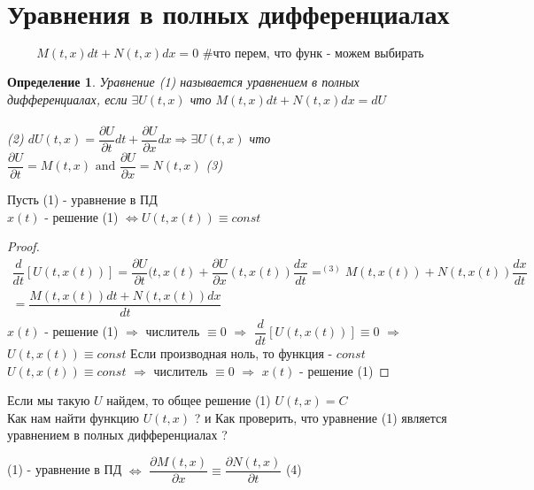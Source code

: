 \documentclass[12pt,a4paper,hidelinks]{article}            %
\newcommand{\pd}[2]{\dfrac{\partial #1}{\partial #2}}
\newcommand{\dd}[2]{\dfrac{d #1}{d #2}}
\newtheorem*{mdef}{Определение}
\begin{document}
\section{Уравнения в полных дифференциалах}
\begin{equation}\tag{1}
  M(t,x)dt+N(t,x)dx=0  
  \mbox{ \# что перем, что функ - можем выбирать}
\end{equation}
\begin{mdef}
	Уравнение (1) называется уравнением в полных дифференциалах, если $\exists U(t,x)$ что $M(t,x)dt+N(t,x)dx=dU$ \\\\
	(2) $dU(t,x)=\pd{U}{t}dt+\pd{U}{x}dx\Rightarrow\exists U(t,x)$ что $\pd{U}{t}=M(t,x) \mbox{ and } \pd{U}{x}=N(t,x)$ (3)
\end{mdef}

\begin{thm-hand}[1]
	Пусть (1) - уравнение в ПД \\
	$x(t)$ - решение (1) $\Longleftrightarrow U(t,x(t))\equiv const$
\end{thm-hand}
\begin{proof}
	\begin{multline*}
		\dfrac{d}{dt}[U(t,x(t))]=\pd{U}{t}(t,x(t)+\pd{U}{x}(t,x(t))\dd{x}{t}=^{(3)}M(t,x(t))+N(t,x(t))\dd{x}{t}\\=\dfrac{M(t,x(t))dt+N(t,x(t))dx}{dt}
	\end{multline*}
	\boxed{$\Longrightarrow$} 
	$x(t)$ - решение (1) $\Longrightarrow$ числитель $\equiv 0$ $\Longrightarrow$ $\dfrac{d}{dt}[U(t,x(t))]\equiv0$ $\Longrightarrow$ $U(t,x(t))\equiv const$ Если производная ноль, то функция - $const$ \\
	\boxed{$\Longleftarrow$}
	$U(t,x(t))\equiv const$ $\Longrightarrow$ числитель $\equiv 0$ $\Longrightarrow$ $x(t)$ - решение (1)
\end{proof}
Если мы такую $U$ найдем, то общее решение (1) $U(t,x)=C$ \\
Как нам найти функцию $U(t,x)$ ? и Как проверить, что уравнение (1) является уравнением в полных дифференциалах ? \\
\begin{thm-hand}[2]
	(1) - уравнение в ПД $\Longleftrightarrow$ $\pd{M(t,x)}{x}\equiv \pd{N(t,x)}{t}$ (4)
\end{thm-hand}
\end{document}
